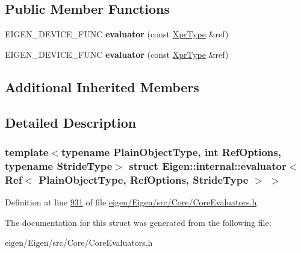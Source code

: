 \subsection*{Public Member Functions}
\begin{DoxyCompactItemize}
\item 
\mbox{\label{struct_eigen_1_1internal_1_1evaluator_3_01_ref_3_01_plain_object_type_00_01_ref_options_00_01_stride_type_01_4_01_4_aa40eaa3e61a3df553e893fcf4bc0c837}} 
E\+I\+G\+E\+N\+\_\+\+D\+E\+V\+I\+C\+E\+\_\+\+F\+U\+NC {\bfseries evaluator} (const \hyperlink{group___core___module_class_eigen_1_1_ref}{Xpr\+Type} \&ref)
\item 
\mbox{\label{struct_eigen_1_1internal_1_1evaluator_3_01_ref_3_01_plain_object_type_00_01_ref_options_00_01_stride_type_01_4_01_4_aa40eaa3e61a3df553e893fcf4bc0c837}} 
E\+I\+G\+E\+N\+\_\+\+D\+E\+V\+I\+C\+E\+\_\+\+F\+U\+NC {\bfseries evaluator} (const \hyperlink{group___core___module_class_eigen_1_1_ref}{Xpr\+Type} \&ref)
\end{DoxyCompactItemize}
\subsection*{Additional Inherited Members}


\subsection{Detailed Description}
\subsubsection*{template$<$typename Plain\+Object\+Type, int Ref\+Options, typename Stride\+Type$>$\newline
struct Eigen\+::internal\+::evaluator$<$ Ref$<$ Plain\+Object\+Type, Ref\+Options, Stride\+Type $>$ $>$}



Definition at line \hyperlink{eigen_2_eigen_2src_2_core_2_core_evaluators_8h_source_l00931}{931} of file \hyperlink{eigen_2_eigen_2src_2_core_2_core_evaluators_8h_source}{eigen/\+Eigen/src/\+Core/\+Core\+Evaluators.\+h}.



The documentation for this struct was generated from the following file\+:\begin{DoxyCompactItemize}
\item 
eigen/\+Eigen/src/\+Core/\+Core\+Evaluators.\+h\end{DoxyCompactItemize}
